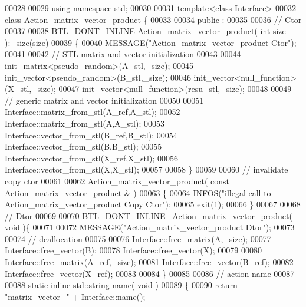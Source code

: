 \begin{DoxyCode}
00028 
00029 \textcolor{keyword}{using namespace }\hyperlink{namespacestd}{std};
00030 
00031 \textcolor{keyword}{template}<\textcolor{keyword}{class} Interface>
\hyperlink{class_action__matrix__vector__product}{00032} \textcolor{keyword}{class }\hyperlink{class_action__matrix__vector__product}{Action\_matrix\_vector\_product} \{
00033 
00034 public :
00035 
00036   \textcolor{comment}{// Ctor}
00037 
00038   BTL\_DONT\_INLINE \hyperlink{class_action__matrix__vector__product}{Action\_matrix\_vector\_product}( \textcolor{keywordtype}{int} size ):\_size(size)
00039   \{
00040     MESSAGE(\textcolor{stringliteral}{"Action\_matrix\_vector\_product Ctor"});
00041 
00042     \textcolor{comment}{// STL matrix and vector initialization}
00043 
00044     init\_matrix<pseudo\_random>(A\_stl,\_size);
00045     init\_vector<pseudo\_random>(B\_stl,\_size);
00046     init\_vector<null\_function>(X\_stl,\_size);
00047     init\_vector<null\_function>(resu\_stl,\_size);
00048 
00049     \textcolor{comment}{// generic matrix and vector initialization}
00050 
00051     Interface::matrix\_from\_stl(A\_ref,A\_stl);
00052     Interface::matrix\_from\_stl(A,A\_stl);
00053     Interface::vector\_from\_stl(B\_ref,B\_stl);
00054     Interface::vector\_from\_stl(B,B\_stl);
00055     Interface::vector\_from\_stl(X\_ref,X\_stl);
00056     Interface::vector\_from\_stl(X,X\_stl);
00057 
00058   \}
00059 
00060   \textcolor{comment}{// invalidate copy ctor}
00061 
00062   Action\_matrix\_vector\_product( \textcolor{keyword}{const}  Action\_matrix\_vector\_product & )
00063   \{
00064     INFOS(\textcolor{stringliteral}{"illegal call to Action\_matrix\_vector\_product Copy Ctor"});
00065     exit(1);
00066   \}
00067 
00068   \textcolor{comment}{// Dtor}
00069 
00070   BTL\_DONT\_INLINE ~Action\_matrix\_vector\_product( \textcolor{keywordtype}{void} )\{
00071 
00072     MESSAGE(\textcolor{stringliteral}{"Action\_matrix\_vector\_product Dtor"});
00073 
00074     \textcolor{comment}{// deallocation}
00075 
00076     Interface::free\_matrix(A,\_size);
00077     Interface::free\_vector(B);
00078     Interface::free\_vector(X);
00079 
00080     Interface::free\_matrix(A\_ref,\_size);
00081     Interface::free\_vector(B\_ref);
00082     Interface::free\_vector(X\_ref);
00083 
00084   \}
00085 
00086   \textcolor{comment}{// action name}
00087 
00088   \textcolor{keyword}{static} \textcolor{keyword}{inline} std::string name( \textcolor{keywordtype}{void} )
00089   \{
00090     \textcolor{keywordflow}{return} \textcolor{stringliteral}{"matrix\_vector\_"} + Interface::name();

\end{DoxyCode}
